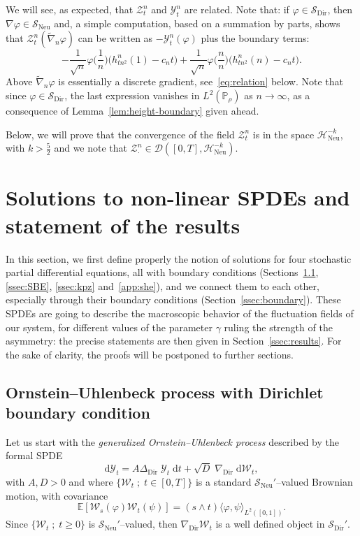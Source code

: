 \documentclass[AHL,Unicode,longabstracts]{cedram}
\DeclareMathOperator{\Dir}{Dir}
\DeclareMathOperator{\Neu}{Neu}
\newcommand{\bb}[1]{{\mathbb #1}}
\newcommand{\mc}[1]{{\mathcal #1}}
\renewcommand{\mc}[1]{{\mathcal #1}}
\newcommand{\SD}{\ensuremath{\mc S_{\Dir}}}
\newcommand{\SN}{\ensuremath{\mc S_{\Neu}}}
\renewcommand{\geq}{\geqslant}
\renewcommand{\tilde}{\widetilde}
\newcommand*{\dd}{\mathrm{d}}
\newcommand*{\dt}{\dd t}
\renewcommand{\tfrac}{\frac}
\begin{document}
\begin{rema}
We will see, as expected, that $\mc Z_t^n$ and $\mc Y_t^n$ are related. Note that: if $\varphi \in\SD$, then $\nabla\varphi \in \SN$ and, a simple computation, based on a summation by parts, shows that $\mc Z_t^n(\tilde \nabla_n \varphi)$ can be written as $-\mc Y_t^n(\varphi)$ plus the boundary terms:
\[
-\tfrac{1}{\sqrt n}\varphi\bigg(\tfrac1n\bigg)\big(h_{tn^2}^n(1)-c_nt\big) + \tfrac{1}{\sqrt n}\varphi\bigg(\tfrac n n\bigg)\big(h_{tn^2}^n(n)-c_nt\big).
\]
Above $\tilde \nabla_n \varphi$ is essentially a discrete gradient, see~\eqref{eq:relation} below. Note that since $\varphi \in\SD$, the last expression vanishes in $ L^2(\bb P_\rho)$ as $n\to\infty$, as a consequence of Lemma~\ref{lem:height-boundary} given ahead.
\end{rema}

Below, we will prove that the convergence of the field $\mc Z_t^n$ is in the space $\mc H_{\Neu}^{-k}$, with $k>\frac52$ and we note that $\mc Z^n_\cdot \in \mathcal{D}([0,T], \mathcal{H}_{\Neu}^{-k})$.


\section{Solutions to non-linear SPDEs and statement of the results}\label{s3}

In this section, we first define properly the notion of solutions for four stochastic partial differential equations, all with boundary conditions (Sections~\ref{ssec:0U}, \ref{ssec:SBE}, \ref{ssec:kpz} and~\ref{app:she}), and we connect them to each other, especially through their boundary conditions (Section~\ref{ssec:boundary}). These SPDEs are going to describe the macroscopic behavior of the fluctuation fields of our system, for different values of the parameter $\gamma$ ruling the strength of the asymmetry: the precise statements are then given in Section~\ref{ssec:results}. For the sake of clarity, the proofs will be postponed to further sections.

\subsection{Ornstein--Uhlenbeck process with Dirichlet boundary condition}\label{ssec:0U}

Let us start with the \emph{generalized Ornstein--Uhlenbeck process} described by the formal SPDE
\begin{equation}\label{eq:OU}
\dd\mathcal Y_t = A\Delta_{\Dir} \;\mathcal Y_t \;\dt + \sqrt{D}\; \nabla_{\Dir} \;\dd\mc W_t,
\end{equation}
with $A,D > 0$ and where $\{\mc W_t \; ; \; t\in [0,T]\}$ is a standard $\SN'$--valued Brownian motion, with covariance
\begin{equation}\label{eq:Bm-cov}
\bb E[\mc W_s(\varphi) \mc W_t(\psi)] = (s \wedge t) \langle \varphi,\psi \rangle_{L^2([0,1])}.
\end{equation}
Since $\{\mc W_t\; ; \; t\geq 0\}$ is $\SN'$--valued, then $\nabla_{\Dir}\mc W_t$ is a well defined object in $\SD'$.
\end{document}
